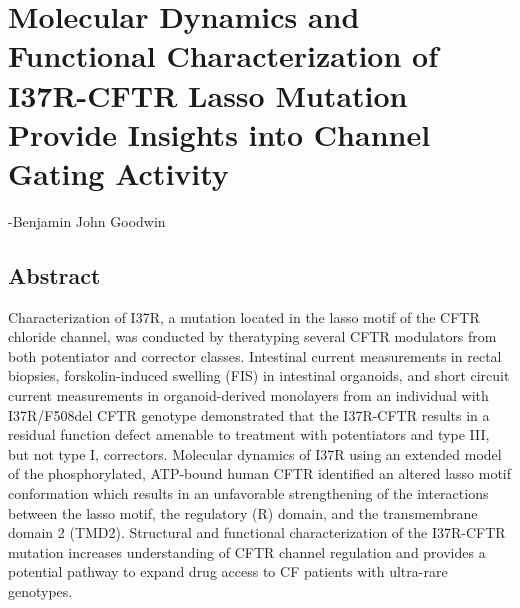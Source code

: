 \chapter{Molecular Dynamics and Functional Characterization of I37R-CFTR Lasso Mutation Provide Insights into Channel Gating Activity}
\label{chap:i37r}
 {-Benjamin John Goodwin}

\section*{\centering Abstract} 

Characterization of I37R, a mutation located in the lasso motif of the CFTR chloride channel, was conducted by theratyping several CFTR modulators from both potentiator and corrector classes. Intestinal current measurements in rectal biopsies, forskolin-induced swelling (FIS) in intestinal organoids, and short circuit current measurements in organoid-derived monolayers from an individual with I37R/F508del CFTR genotype demonstrated that the I37R-CFTR results in a residual function defect amenable to treatment with potentiators and type III, but not type I, correctors. Molecular dynamics of I37R using an extended model of the phosphorylated, ATP-bound human CFTR identified an altered lasso motif conformation which results in an unfavorable strengthening of the interactions between the lasso motif, the regulatory (R) domain, and the transmembrane domain 2 (TMD2). Structural and functional characterization of the I37R-CFTR mutation increases understanding of CFTR channel regulation and provides a potential pathway to expand drug access to CF patients with ultra-rare genotypes.\\

\smallskip

